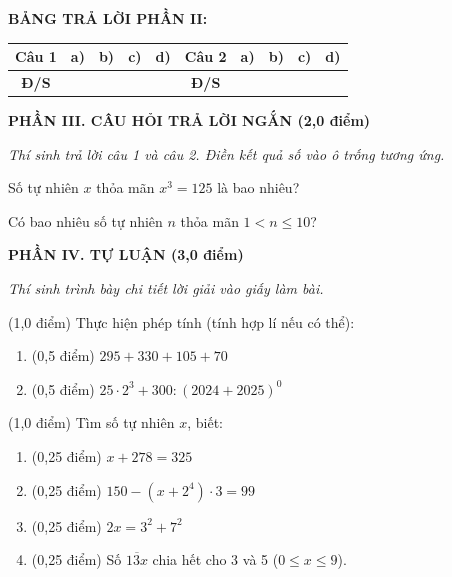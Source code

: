 \documentclass[12pt,a4paper]{article}
\begin{document}
\noindent\textbf{BẢNG TRẢ LỜI PHẦN II:}
\begin{center}
\begin{tabular}{|c|c|c|c|c||c|c|c|c|c|}
\hline
\textbf{Câu 1} & \textbf{a)} & \textbf{b)} & \textbf{c)} & \textbf{d)} & \textbf{Câu 2} & \textbf{a)} & \textbf{b)} & \textbf{c)} & \textbf{d)} \\
\hline
\textbf{Đ/S} & \rule{0pt}{0.6cm} & & & & \textbf{Đ/S} & & & & \\
\hline
\end{tabular}
\end{center}
\vspace{2mm}

\setcounter{ex}{0}
\noindent\textbf{\large PHẦN III. CÂU HỎI TRẢ LỜI NGẮN (2,0 điểm)}

\textit{Thí sinh trả lời câu 1 và câu 2. Điền kết quả số vào ô trống tương ứng.}

\vspace{1mm}
\begin{ex}
Số tự nhiên $x$ thỏa mãn $x^3 = 125$ là bao nhiêu? 
\end{ex}

\begin{ex}
Có bao nhiêu số tự nhiên $n$ thỏa mãn $1 < n \le 10$? 
\end{ex}


\setcounter{ex}{0}
\noindent\textbf{\large PHẦN IV. TỰ LUẬN (3,0 điểm)}

\textit{Thí sinh trình bày chi tiết lời giải vào giấy làm bài.}

\vspace{1mm}
\begin{ex} (1,0 điểm)
Thực hiện phép tính (tính hợp lí nếu có thể):
\begin{enumerate}[label=\textbf{\alph*)}, leftmargin=0.8cm, itemsep=2pt]
\item (0,5 điểm) $295 + 330 + 105 + 70$
\item (0,5 điểm) $25 \cdot 2^3 + 300 : (2024 + 2025)^0$
\end{enumerate}
\end{ex}
\vspace{1.5mm}

\begin{ex} (1,0 điểm)
Tìm số tự nhiên $x$, biết:
\begin{enumerate}[label=\textbf{\alph*)}, leftmargin=0.8cm, itemsep=2pt]
\item (0,25 điểm) $x + 278 = 325$
\item (0,25 điểm) $150 - (x + 2^4) \cdot 3 = 99$
\item (0,25 điểm) $2x = 3^2 + 7^2$
\item (0,25 điểm) Số $\overline{13x}$ chia hết cho 3 và 5 ($0 \le x \le 9$).
\end{enumerate}
\end{ex}
\vspace{1.5mm}
\end{document}
